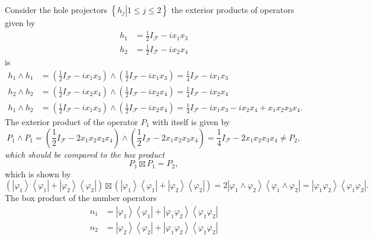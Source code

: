\documentclass[aps,preprint]{revtex4}%
\begin{document}
Consider the hole projectors $\left\{  \left.  h_{j}\right\vert 1\leq
j\leq2\right\}  $ the exterior products of operators given by
\begin{align}
h_{1} &  =\frac{1}{2}I_{\mathcal{F}}-ix_{1}x_{3}\\
h_{2} &  =\frac{1}{2}I_{\mathcal{F}}-ix_{2}x_{4}%
\end{align}
is%
\begin{align}
h_{1}\wedge h_{1} &  =\left(  \frac{1}{2}I_{\mathcal{F}}-ix_{1}x_{3}\right)
\wedge\left(  \frac{1}{2}I_{\mathcal{F}}-ix_{1}x_{3}\right)  =\frac{1}%
{4}I_{\mathcal{F}}-ix_{1}x_{3}\\
h_{2}\wedge h_{2} &  =\left(  \frac{1}{2}I_{\mathcal{F}}-ix_{2}x_{4}\right)
\wedge\left(  \frac{1}{2}I_{\mathcal{F}}-ix_{2}x_{4}\right)  =\frac{1}%
{4}I_{\mathcal{F}}-ix_{2}x_{4}\\
h_{1}\wedge h_{2} &  =\left(  \frac{1}{2}I_{\mathcal{F}}-ix_{1}x_{3}\right)
\wedge\left(  \frac{1}{2}I_{\mathcal{F}}-ix_{2}x_{4}\right)  =\frac{1}%
{4}I_{\mathcal{F}}-ix_{1}x_{3}-ix_{2}x_{4}+x_{1}x_{2}x_{3}x_{4}.
\end{align}
The exterior product of the operator $P_{1}$ with itself is given by
\begin{equation}
P_{1}\wedge P_{1}=\left(  \frac{1}{2}I_{\mathcal{F}}-2x_{1}x_{2}x_{3}%
x_{4}\right)  \wedge\left(  \frac{1}{2}I_{\mathcal{F}}-2x_{1}x_{2}x_{3}%
x_{4}\right)  =\frac{1}{4}I_{\mathcal{F}}-2x_{1}x_{2}x_{3}x_{4}\neq P_{2},
\end{equation}
\emph{which should be compared to the box product}
\begin{equation}
P_{1}\boxtimes P_{1}=P_{2},
\end{equation}
which is shown by
\begin{equation}
\left(  \left\vert \varphi_{1}\right\rangle \left\langle \varphi
_{1}\right\vert +\left\vert \varphi_{2}\right\rangle \left\langle \varphi
_{2}\right\vert \right)  \boxtimes\left(  \left\vert \varphi_{1}\right\rangle
\left\langle \varphi_{1}\right\vert +\left\vert \varphi_{2}\right\rangle
\left\langle \varphi_{2}\right\vert \right)  =2\left\vert \varphi_{1}%
\wedge\varphi_{2}\right\rangle \left\langle \varphi_{1}\wedge\varphi
_{2}\right\vert =\left\vert \varphi_{1}\varphi_{2}\right\rangle \left\langle
\varphi_{1}\varphi_{2}\right\vert .
\end{equation}
The box product of the number operators
\begin{align}
n_{1}  & =\left\vert \varphi_{1}\right\rangle \left\langle \varphi
_{1}\right\vert +\left\vert \varphi_{1}\varphi_{2}\right\rangle \left\langle
\varphi_{1}\varphi_{2}\right\vert \\
n_{2}  & =\left\vert \varphi_{2}\right\rangle \left\langle \varphi
_{2}\right\vert +\left\vert \varphi_{1}\varphi_{2}\right\rangle \left\langle
\varphi_{1}\varphi_{2}\right\vert
\end{align}
\end{document}
